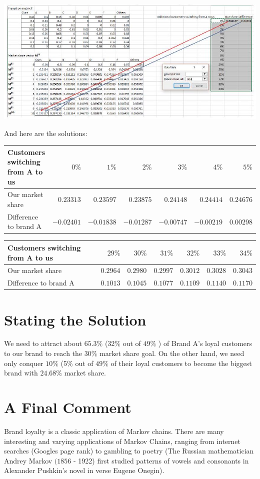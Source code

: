 \documentclass[10pt]{article}
\begin{document}
\includegraphics[max width=\textwidth]{2022_07_05_5945264bba2a5f6ba667g-78(1)}

And here are the solutions:

\begin{tabular}{|l|r|r|r|r|r|r|}
\hline
Customers switching from A to us & $0 \%$ & $1 \%$ & $2 \%$ & $3 \%$ & $4 \%$ & $5 \%$ \\
\hline
Our market share & $0.23313$ & $0.23597$ & $0.23875$ & $0.24148$ & $0.24414$ & $0.24676$ \\
\hline
Difference to brand A & $-0.02401$ & $-0.01838$ & $-0.01287$ & $-0.00747$ & $-0.00219$ & $0.00298$ \\
\hline
\end{tabular}

\begin{tabular}{|l|r|r|r|r|r|r|}
\hline
Customers switching from A to us & $29 \%$ & $30 \%$ & $31 \%$ & $32 \%$ & $33 \%$ & $34 \%$ \\
\hline
Our market share & $0.2964$ & $0.2980$ & $0.2997$ & $0.3012$ & $0.3028$ & $0.3043$ \\
\hline
Difference to brand A & $0.1013$ & $0.1045$ & $0.1077$ & $0.1109$ & $0.1140$ & $0.1170$ \\
\hline
\end{tabular}

\section{Stating the Solution}
We need to attract about $65.3 \%$ (32\% out of $49 \%$ ) of Brand A's loyal customers to our brand to reach the $30 \%$ market share goal. On the other hand, we need only conquer $10 \%$ (5\% out of $49 \%$ of their loyal customers to become the biggest brand with $24.68 \%$ market share.

\section{A Final Comment}
Brand loyalty is a classic application of Markov chains. There are many interesting and varying applications of Markov Chains, ranging from internet searches (Googles page rank) to gambling to poetry (The Russian mathematician Andrey Markov $(1856$ - 1922) first studied patterns of vowels and consonants in Alexander Pushkin's novel in verse Eugene Onegin).
\end{document}
